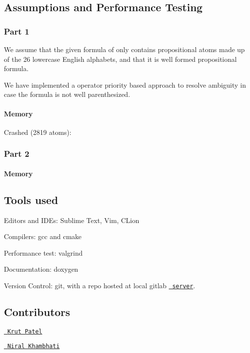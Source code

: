 \subsection*{Assumptions and Performance Testing}

\subsubsection*{Part 1}


\begin{DoxyItemize}
\item We assume that the given formula of only contains propositional atoms made up of the 26 lowercase English alphabets, and that it is well formed propositional formula.
\item We have implemented a operator priority based approach to resolve ambiguity in case the formula is not well parenthesized.
\end{DoxyItemize}

\paragraph*{Memory}

  Crashed (2819 atoms)\+: 

\subsubsection*{Part 2}

\paragraph*{Memory}



\subsection*{Tools used}


\begin{DoxyItemize}
\item Editors and I\+D\+Es\+: Sublime Text, Vim, C\+Lion
\item Compilers\+: gcc and cmake
\item Performance test\+: valgrind
\item Documentation\+: doxygen
\item Version Control\+: git, with a repo hosted at local gitlab \href{https://td.bits-hyderabad.ac.in/lab/mach64/logic-assgn-2/}\texttt{ server}.
\end{DoxyItemize}

\subsection*{Contributors}


\begin{DoxyItemize}
\item \href{f20170184@hyderabad.bits-pilani.ac.in}\texttt{ Krut Patel}
\item \href{f20170130@hyderabad.bits-pilani.ac.in}\texttt{ Niral Khambhati} 
\end{DoxyItemize}